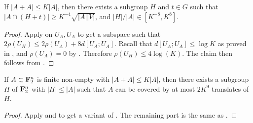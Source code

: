 \begin{corollary}\label{pfr-9-aux}
If $|A+A| \leq K|A|$, then there exists a subgroup $H$ and $t\in G$ such that $|A \cap (H+t)| \geq K^{-4} \sqrt{|A||V|}$, and $|H|/|A|\in[K^{-8},K^8]$.
\end{corollary}
\begin{proof}
  Apply  on $U_A,U_A$ to get a subspace such that $2\rho(U_H)\le 2\rho(U_A)+8d[U_A;U_A]$. Recall that $d[U_A;U_A]\le \log K$ as proved in , and $\rho(U_A)=0$ by . Therefore $\rho(U_H)\le 4\log(K)$. The claim then follows from .
\end{proof}

\begin{theorem}[PFR with \texorpdfstring{$C=9$}{C=9}]  If $A \subset {\bf F}_2^n$ is finite non-empty with $|A+A| \leq K|A|$, then there exists a subgroup $H$ of ${\bf F}_2^n$ with $|H| \leq |A|$ such that $A$ can be covered by at most $2K^9$ translates of $H$.
\end{theorem}

\begin{proof}
Apply  and  to get a variant of . The remaining part is the same as .
\end{proof}
